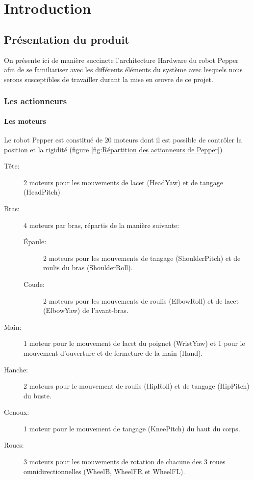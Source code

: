 \chapter{Introduction}
\label{Introduction}
\thispagestyle{fancy}

\section{Présentation du produit}
\label{Introduction:Présentation du produit}
On présente ici de manière succincte l'architecture Hardware du robot Pepper afin de se familiariser avec les différents éléments du système avec lesquels nous serons susceptibles de travailler durant la mise en œuvre de ce projet.  

\subsection{Les actionneurs}
\label{Introduction:Présentation du produit:Les actionneurs}
\subsubsection{Les moteurs}
\label{Introduction:Présentation du produit:Les actionneurs: Les moteurs}
Le robot Pepper est constitué de 20 moteurs dont il est possible de contrôler la position et la rigidité (figure \ref{fig:Répartition des actionneurs de Pepper})
\begin{description}
	\item [Tête:] 2 moteurs pour les mouvements de lacet (HeadYaw) et de tangage (HeadPitch)
	\item [Bras:] 4 moteurs par bras, répartis de la manière suivante: 
	\begin{description}
		\item [Épaule:] 2 moteurs pour les mouvements de tangage (ShoulderPitch) et de roulis du bras (ShoulderRoll).
		\item [Coude:] 2 moteurs pour les mouvements de roulis (ElbowRoll) et de lacet (ElbowYaw) de l'avant-bras.
	\end{description}
	\item [Main:] 1 moteur pour le mouvement de lacet du poignet (WristYaw) et 1 pour le mouvement d'ouverture et de fermeture de la main (Hand).
	\item [Hanche:] 2 moteurs pour le mouvement de roulis (HipRoll) et de tangage (HipPitch) du buste.
	\item [Genoux:] 1 moteur pour le mouvement de tangage (KneePitch) du haut du corps.
	\item [Roues:] 3 moteurs pour les mouvements de rotation de chacune des 3 roues omnidirectionnelles (WheelB, WheelFR et WheelFL).
\end{description}

